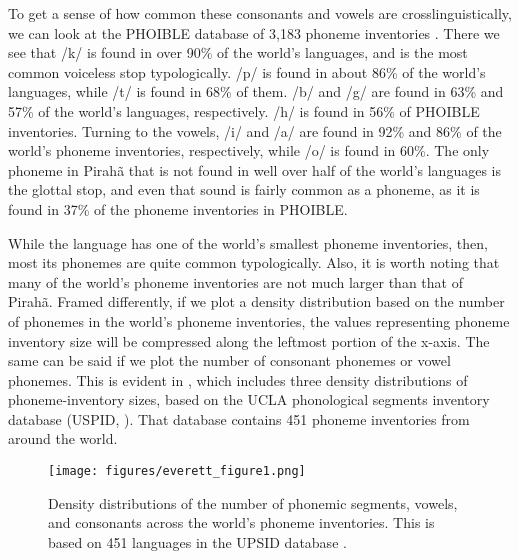 \documentclass[output=paper,colorlinks,citecolor=brown
]{langscibook}
\begin{document}
    To get a sense of how common these consonants and vowels are crosslinguistically, we can look at the PHOIBLE database of 3,183 phoneme inventories \citep{phoible}. There we see that /k/ is found in over 90\% of the world’s languages, and is the most common voiceless stop typologically. /p/ is found in about 86\% of the world’s languages, while /t/ is found in 68\% of them. /b/ and /g/ are found in 63\% and 57\% of the world’s languages, respectively. /h/ is found in 56\% of PHOIBLE inventories. Turning to the vowels, /i/ and /a/ are found in 92\% and 86\% of the world’s phoneme inventories, respectively, while /o/ is found in 60\%. The only phoneme in Pirahã that is not found in well over half of the world’s languages is the glottal stop, and even that sound is fairly common as a phoneme, as it is found in 37\% of the phoneme inventories in PHOIBLE.

    While the language has one of the world’s smallest phoneme inventories, then, most its phonemes are quite common typologically. Also, it is worth noting that many of the world's phoneme inventories are not much larger than that of Pirahã. Framed differently, if we plot a density distribution based on the number of phonemes in the world’s phoneme inventories, the values representing phoneme inventory size will be compressed along the leftmost portion of the x-axis. The same can be said if we plot the number of consonant phonemes or vowel phonemes. This is evident in , which includes three density distributions of phoneme-inventory sizes, based on the UCLA phonological segments inventory database (USPID, \citealt{maddieson1989updating}). That database contains 451 phoneme inventories from around the world.
        
    \begin{figure}
    \texttt{[image: figures/everett\_figure1.png]}
    \caption{\label{everett-figure-1}Density distributions of the number of phonemic segments, vowels, and consonants across the world’s phoneme inventories. This is based on 451 languages in the UPSID database \citep{maddieson1989updating}.}
    \end{figure}
\end{document}
